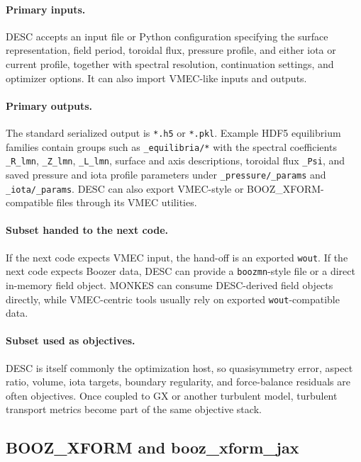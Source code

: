 \documentclass[11pt]{article}
\newcommand{\code}[1]{\texttt{#1}}
\begin{document}
\paragraph{Primary inputs.}
DESC accepts an input file or Python configuration specifying the surface
representation, field period, toroidal flux, pressure profile, and either iota
or current profile, together with spectral resolution, continuation settings,
and optimizer options. It can also import VMEC-like inputs and outputs.

\paragraph{Primary outputs.}
The standard serialized output is \code{*.h5} or \code{*.pkl}. Example HDF5
equilibrium families contain groups such as \code{\_equilibria/*} with the
spectral coefficients \code{\_R\_lmn}, \code{\_Z\_lmn}, \code{\_L\_lmn},
surface and axis descriptions, toroidal flux \code{\_Psi}, and saved pressure
and iota profile parameters under \code{\_pressure/\_params} and
\code{\_iota/\_params}. DESC can also export VMEC-style or
BOOZ\_XFORM-compatible files through its VMEC utilities.

\paragraph{Subset handed to the next code.}
If the next code expects VMEC input, the hand-off is an exported \code{wout}.
If the next code expects Boozer data, DESC can provide a \code{boozmn}-style
file or a direct in-memory field object. MONKES can consume DESC-derived field
objects directly, while VMEC-centric tools usually rely on exported
\code{wout}-compatible data.

\paragraph{Subset used as objectives.}
DESC is itself commonly the optimization host, so quasisymmetry error, aspect
ratio, volume, iota targets, boundary regularity, and force-balance residuals
are often objectives. Once coupled to GX or another turbulent model, turbulent
transport metrics become part of the same objective stack.

\subsection{BOOZ\_XFORM and booz\_xform\_jax}
\end{document}
